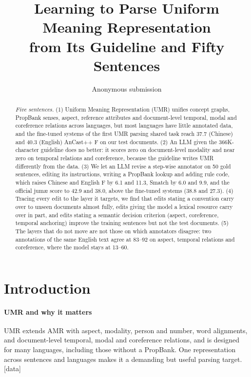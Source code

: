 \documentclass[11pt]{article}
\title{Learning to Parse Uniform Meaning Representation\\
from Its Guideline and Fifty Sentences}
\author{Anonymous submission}
\newcommand{\jumach}{ju\textlengthmark{}m\ae{}\textteshlig{}\xspace}
\newcommand{\stag}[2]{\textcolor{#1}{\textsf{\scriptsize[#2]}}}
\newcommand{\HAVE}{\stag{green!50!black}{data}\xspace}
\begin{document}
\maketitle

\begin{abstract}
\emph{Five sentences.}
(1) Uniform Meaning Representation (UMR) unifies concept graphs, PropBank senses, aspect, reference attributes and document-level temporal, modal and coreference relations across languages, but most languages have little annotated data, and the fine-tuned systems of the first UMR parsing shared task reach 37.7 (Chinese) and 40.3 (English) AnCast++ F on our test documents.
(2) An LLM given the 366K-character guideline does no better: it scores zero on document-level modality and near zero on temporal relations and coreference, because the guideline writes UMR differently from the data.
(3) We let an LLM revise a step-wise annotator on 50 gold sentences, editing its instructions, writing a PropBank lookup and adding rule code, which raises Chinese and English F by 6.1 and 11.3, Smatch by 6.0 and 9.9, and the official \jumach score to 42.9 and 38.0, above the fine-tuned systems (38.8 and 27.3).
(4) Tracing every edit to the layer it targets, we find that edits stating a convention carry over to unseen documents almost fully, edits giving the model a lexical resource carry over in part, and edits stating a semantic decision criterion (aspect, coreference, temporal anchoring) improve the training sentences but not the test documents.
(5) The layers that do not move are not those on which annotators disagree: two annotations of the same English text agree at 83--92 on aspect, temporal relations and coreference, where the model stays at 13--60.
\end{abstract}

\section{Introduction}
\label{sec:intro}

\paragraph{UMR and why it matters}
UMR \citep{vangysel2021designing,bonn2024building} extends AMR \citep{banarescu2013abstract} with aspect, modality, person and number, word alignments, and document-level temporal, modal and coreference relations, and is designed for many languages, including those without a PropBank. One representation across sentences and languages makes it a demanding but useful parsing target. \HAVE
\end{document}
